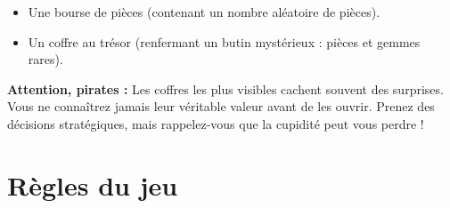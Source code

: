 \documentclass{pirategame}
\begin{document}
\begin{itemize}[resume*=treasures]
  \item Une bourse de pièces (contenant un nombre aléatoire de pièces).
  \item Un coffre au trésor (renfermant un butin mystérieux : pièces et gemmes rares).
\end{itemize}

\textbf{Attention, pirates :} Les coffres les plus visibles cachent souvent des surprises. Vous ne connaîtrez jamais leur véritable valeur avant de les ouvrir. Prenez des décisions stratégiques, mais rappelez-vous que la cupidité peut vous perdre !



\section{Règles du jeu}
\end{document}
